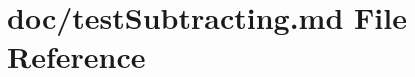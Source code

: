 \hypertarget{test_subtracting_8md}{}\section{doc/test\+Subtracting.md File Reference}
\label{test_subtracting_8md}
